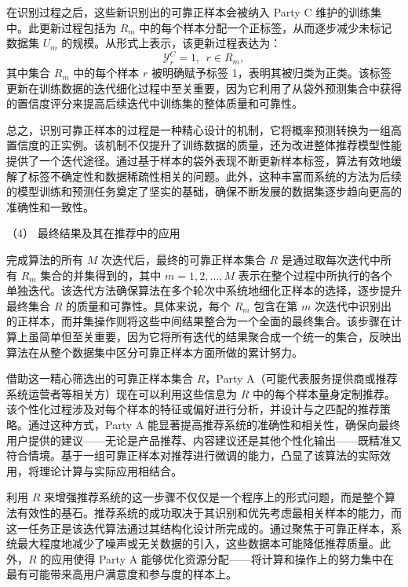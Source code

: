 在识别过程之后，这些新识别出的可靠正样本会被纳入 Party C 维护的训练集中。此更新过程包括为 ${{R}_{m}}$ 中的每个样本分配一个正标签，从而逐步减少未标记数据集 ${{U}_{m}}$ 的规模。从形式上表示，该更新过程表达为：
\begin{equation}
	\mathsf{\mathcal{Y}}_{r}^{C}=1,\ \ r\in {{R}_{m}},
\end{equation}
其中集合 ${{R}_{m}}$ 中的每个样本 $r$ 被明确赋予标签 1，表明其被归类为正类。该标签更新在训练数据的迭代细化过程中至关重要，因为它利用了从袋外预测集合中获得的置信度评分来提高后续迭代中训练集的整体质量和可靠性。

总之，识别可靠正样本的过程是一种精心设计的机制，它将概率预测转换为一组高置信度的正实例。该机制不仅提升了训练数据的质量，还为改进整体推荐模型性能提供了一个迭代途径。通过基于样本的袋外表现不断更新样本标签，算法有效地缓解了标签不确定性和数据稀疏性相关的问题。此外，这种丰富而系统的方法为后续的模型训练和预测任务奠定了坚实的基础，确保不断发展的数据集逐步趋向更高的准确性和一致性。 

（4） 最终结果及其在推荐中的应用

完成算法的所有 $M$ 次迭代后，最终的可靠正样本集合 $R$ 是通过取每次迭代中所有 ${{R}_{m}}$ 集合的并集得到的，其中 $m = 1, 2, \dots, M$ 表示在整个过程中所执行的各个单独迭代。该迭代方法确保算法在多个轮次中系统地细化正样本的选择，逐步提升最终集合 $R$ 的质量和可靠性。具体来说，每个 ${{R}_{m}}$ 包含在第 $m$ 次迭代中识别出的正样本，而并集操作则将这些中间结果整合为一个全面的最终集合。该步骤在计算上虽简单但至关重要，因为它将所有迭代的结果聚合成一个统一的集合，反映出算法在从整个数据集中区分可靠正样本方面所做的累计努力。

借助这一精心筛选出的可靠正样本集合 $R$，Party A（可能代表服务提供商或推荐系统运营者等相关方）现在可以利用这些信息为 $R$ 中的每个样本量身定制推荐。该个性化过程涉及对每个样本的特征或偏好进行分析，并设计与之匹配的推荐策略。通过这种方式，Party A 能显著提高推荐系统的准确性和相关性，确保向最终用户提供的建议——无论是产品推荐、内容建议还是其他个性化输出——既精准又符合情境。基于一组可靠正样本对推荐进行微调的能力，凸显了该算法的实际效用，将理论计算与实际应用相结合。

利用 $R$ 来增强推荐系统的这一步骤不仅仅是一个程序上的形式问题，而是整个算法有效性的基石。推荐系统的成功取决于其识别和优先考虑最相关样本的能力，而这一任务正是该迭代算法通过其结构化设计所完成的。通过聚焦于可靠正样本，系统最大程度地减少了噪声或无关数据的引入，这些数据本可能降低推荐质量。此外，$R$ 的应用使得 Party A 能够优化资源分配——将计算和操作上的努力集中在最有可能带来高用户满意度和参与度的样本上。

